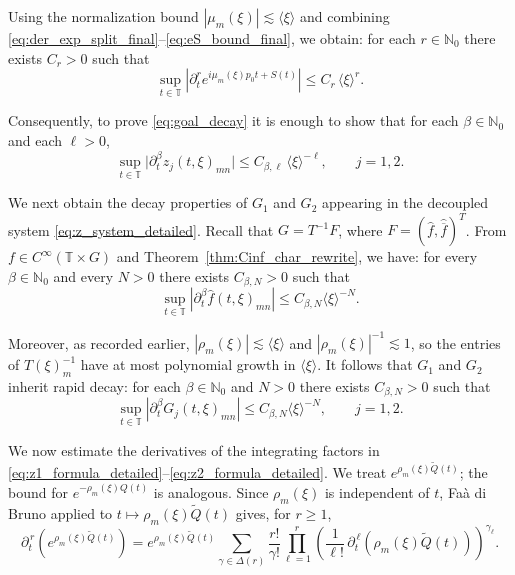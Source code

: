 \documentclass[11pt,reqno]{amsart}
\numberwithin{equation}{section}
\begin{document}
	Using the normalization bound $|\mu_m(\xi)|\lesssim\langle\xi\rangle$ and combining
	\eqref{eq:der_exp_split_final}--\eqref{eq:eS_bound_final}, we obtain: for each $r\in\mathbb{N}_0$ there exists $C_r>0$ such that
	\begin{equation}\label{eq:exp_factor_growth_final}
		\sup_{t\in\mathbb{T}}
		\left|\partial_t^r e^{i\mu_m(\xi)p_0 t+S(t)}\right|
		\le C_r\,\langle\xi\rangle^{r}.
	\end{equation}
	
	Consequently, to prove \eqref{eq:goal_decay} it is enough to show that for each $\beta\in\mathbb{N}_0$ and each $\ell>0$,
	\begin{equation}\label{eq:goal_decay_z_final}
		\sup_{t\in\mathbb{T}}\bigl|\partial_t^\beta z_j(t,\xi)_{mn}\bigr|
		\le C_{\beta,\ell}\,\langle\xi\rangle^{-\ell},
		\qquad j=1,2.
	\end{equation}
	
	\smallskip
	
	We next obtain the decay properties of $G_1$ and $G_2$ appearing in the decoupled system
	\eqref{eq:z_system_detailed}. Recall that $G=T^{-1}F$, where $F=(\widehat f,\widehat{\overline f})^T$.
	From $f\in C^\infty(\mathbb{T}\times G)$ and Theorem~\ref{thm:Cinf_char_rewrite}, we have: for every
	$\beta\in\mathbb{N}_0$ and every $N>0$ there exists $C_{\beta,N}>0$ such that
	\begin{equation*}\label{eq:f_decay_final}
		\sup_{t\in\mathbb{T}}|\partial_t^\beta \widehat f(t,\xi)_{mn}|\le C_{\beta,N}\langle\xi\rangle^{-N}.
	\end{equation*}
	
	Moreover, as recorded earlier, $|\rho_m(\xi)|\lesssim\langle\xi\rangle$ and $|\rho_m(\xi)|^{-1}\lesssim 1$,
	so the entries of $T(\xi)_m^{-1}$ have at most polynomial growth in $\langle\xi\rangle$. It follows that
	$G_1$ and $G_2$ inherit rapid decay: for each $\beta\in\mathbb{N}_0$ and $N>0$ there exists $C_{\beta,N}>0$
	such that
	\begin{equation}\label{eq:G_decay_final}
		\sup_{t\in\mathbb{T}}|\partial_t^\beta G_j(t,\xi)_{mn}|\le C_{\beta,N}\langle\xi\rangle^{-N},
		\qquad j=1,2.
	\end{equation}
	
	\smallskip
	
	We now estimate the derivatives of the integrating factors in \eqref{eq:z1_formula_detailed}--\eqref{eq:z2_formula_detailed}.
	We treat $e^{\rho_m(\xi)\widetilde Q(t)}$; the bound for $e^{-\rho_m(\xi)Q(t)}$ is analogous. Since $\rho_m(\xi)$
	is independent of $t$, Fa\`a di Bruno applied to $t\mapsto \rho_m(\xi)\widetilde Q(t)$ gives, for $r\ge1$,
	\begin{equation*}\label{eq:fdb_erhoQ_final}
		\partial_t^{\,r}\!\left(e^{\rho_m(\xi)\widetilde Q(t)}\right)
		=
		e^{\rho_m(\xi)\widetilde Q(t)}\sum_{\gamma\in\Delta(r)} \frac{r!}{\gamma!}
		\prod_{\ell=1}^{r}\left(\frac{1}{\ell!}\,\partial_t^{\,\ell}(\rho_m(\xi)\widetilde Q(t))\right)^{\gamma_\ell}.
	\end{equation*}
	
\end{document}
